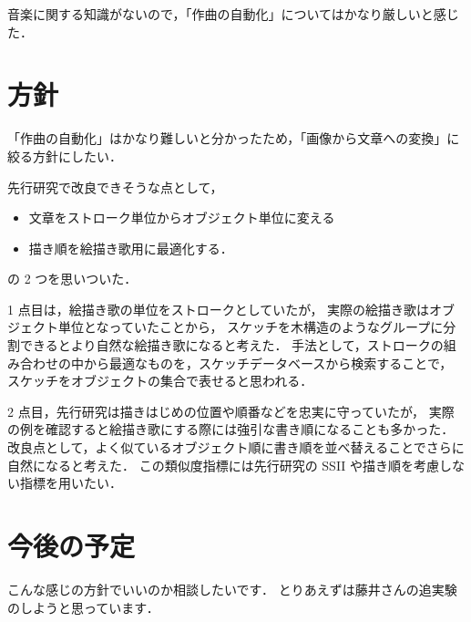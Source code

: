 \documentclass[onecolumn]{ujarticle}   %
\begin{document}
音楽に関する知識がないので，「作曲の自動化」についてはかなり厳しいと感じた．

\section{方針}
「作曲の自動化」はかなり難しいと分かったため，「画像から文章への変換」に絞る方針にしたい．

先行研究で改良できそうな点として，
\begin{itemize}
  \item 文章をストローク単位からオブジェクト単位に変える
  \item 描き順を絵描き歌用に最適化する．
\end{itemize}
の 2 つを思いついた．

1 点目は，絵描き歌の単位をストロークとしていたが，
実際の絵描き歌はオブジェクト単位となっていたことから，
スケッチを木構造のようなグループに分割できるとより自然な絵描き歌になると考えた．
手法として，ストロークの組み合わせの中から最適なものを，スケッチデータベースから検索することで，
スケッチをオブジェクトの集合で表せると思われる．

2 点目，先行研究は描きはじめの位置や順番などを忠実に守っていたが，
実際の例を確認すると絵描き歌にする際には強引な書き順になることも多かった．
改良点として，よく似ているオブジェクト順に書き順を並べ替えることでさらに自然になると考えた．
この類似度指標には先行研究の SSII や描き順を考慮しない指標を用いたい．

\section{今後の予定}
こんな感じの方針でいいのか相談したいです．
とりあえずは藤井さんの追実験のしようと思っています．



\end{document}
